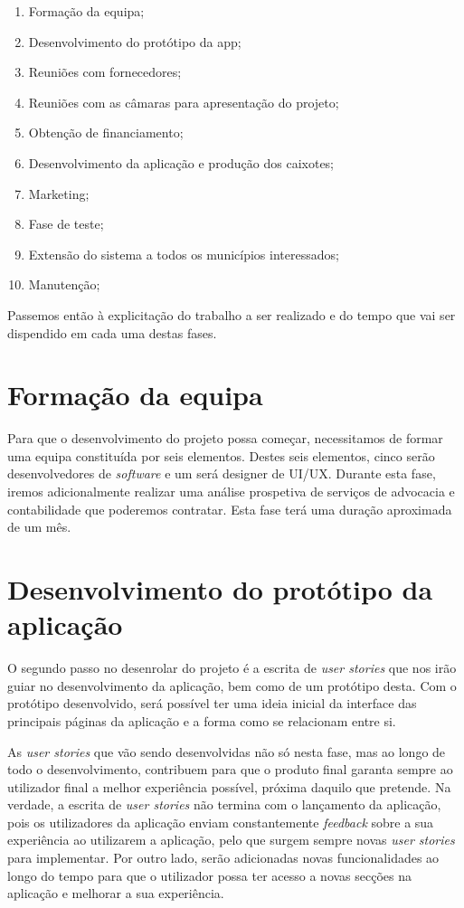 \documentclass[11pt, a4paper, oneside]{book}
\begin{document}
\begin{enumerate}
    \itemsep0em
    \item Formação da equipa;
    \item Desenvolvimento do protótipo da app;
    \item Reuniões com fornecedores;
    \item Reuniões com as câmaras para apresentação do projeto;
    \item Obtenção de financiamento;
    \item Desenvolvimento da aplicação e produção dos caixotes;
    \item Marketing;   
    \item Fase de teste;
    \item Extensão do sistema a todos os municípios interessados;
    \item Manutenção;
\end{enumerate}

Passemos então à explicitação do trabalho a ser realizado e do tempo que vai ser dispendido em cada uma destas fases.

\section{Formação da equipa}

Para que o desenvolvimento do projeto possa começar, necessitamos de formar uma equipa constituída por seis elementos. Destes seis elementos, cinco serão desenvolvedores de \textit{software} e um será designer de UI/UX. Durante esta fase, iremos adicionalmente realizar uma análise prospetiva de serviços de advocacia e contabilidade que poderemos contratar. Esta fase terá uma duração aproximada de um mês.

\section{Desenvolvimento do protótipo da aplicação}

O segundo passo no desenrolar do projeto é a escrita de \textit{user stories} que nos irão guiar no desenvolvimento da aplicação, bem como de um protótipo desta. Com o protótipo desenvolvido, será possível ter uma ideia inicial da interface das principais páginas da aplicação e a forma como se relacionam entre si.

As \textit{user stories} que vão sendo desenvolvidas não só nesta fase, mas ao longo de todo o desenvolvimento, contribuem para que o produto final garanta sempre ao utilizador final a melhor experiência possível, próxima daquilo que pretende. Na verdade, a escrita de \textit{user stories} não termina com o lançamento da aplicação, pois os utilizadores da aplicação enviam constantemente \textit{feedback} sobre a sua experiência ao utilizarem a aplicação, pelo que surgem sempre novas \textit{user stories} para implementar. Por outro lado, serão adicionadas novas funcionalidades ao longo do tempo para que o utilizador possa ter acesso a novas secções na aplicação e melhorar a sua experiência.
\end{document}
